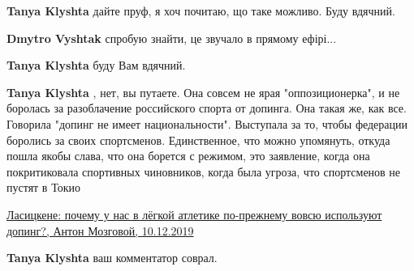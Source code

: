 \begin{itemize}
\begin{itemize}
\begin{itemize}
\textbf{Tanya Klyshta} дайте пруф, я хоч почитаю, що таке можливо. Буду вдячний.

 
\textbf{Dmytro Vyshtak} спробую знайти, це звучало в прямому ефірі...

 
\textbf{Tanya Klyshta} буду Вам вдячний.

 
\textbf{Tanya Klyshta} , нет, вы путаете. Она совсем не ярая "оппозиционерка",
и не боролась за разоблачение российского спорта от допинга. Она такая же, как
все. Говорила "допинг не имеет национальности". Выступала за то, чтобы
федерации боролись за своих спортсменов. Единственное, что можно упомянуть,
откуда пошла якобы слава, что она борется с режимом, это заявление, когда она
покритиковала спортивных чиновников, когда была угроза, что спортсменов не
пустят в Токио

\href{https://www.championat.com/other/news-3920535-lasickene-pochemu-u-nas-v-ljogkoj-atletike-po-prezhnemu-vovsju-ispolzujut-doping.html}{%
Ласицкене: почему у нас в лёгкой атлетике по-прежнему вовсю используют допинг?, Антон Мозговой, 10.12.2019%
}

 
\textbf{Tanya Klyshta} ваш комментатор соврал.

 

\end{itemize}
\end{itemize}
\end{itemize}
